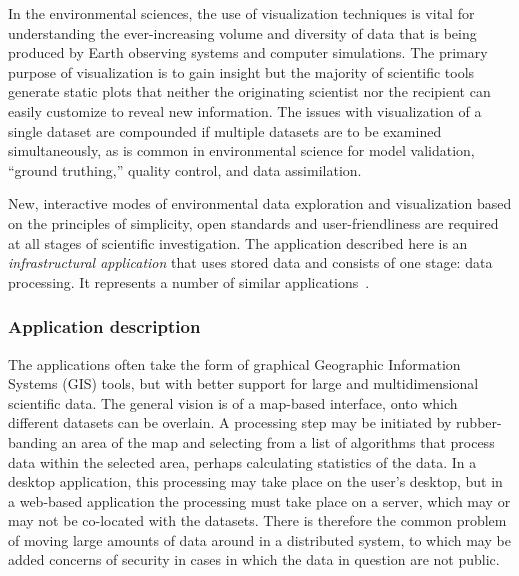 

In the environmental sciences, the use of visualization techniques is
vital for understanding the ever-increasing volume and diversity of
data that is being produced by Earth observing systems and computer
simulations.  The primary purpose of visualization is to gain insight
but the majority of scientific tools generate static plots that
neither the originating scientist nor the recipient can easily
customize to reveal new information. The issues with visualization of
a single dataset are compounded if multiple datasets are to be
examined simultaneously, as is common in environmental science for
model validation, ``ground truthing,'' quality control, and data
assimilation.

New, interactive modes of environmental data exploration and
visualization based on the principles of simplicity, open standards
and user-friendliness are required at all stages of scientific
investigation.  The application described here is an {\em
  infrastructural application} that uses stored data and consists of
one stage: data processing.  It represents a number of similar
applications~\cite{blower1,blower2}.

\subsubsection*{Application description}


The applications often take the form of graphical Geographic
Information Systems (GIS) tools, but with better support for large and multidimensional scientific data. The general vision is of a map-based interface, onto which
different datasets can be overlain.  A processing step may be initiated by rubber-banding an area of
the map and selecting from a list of algorithms that process data within the selected area, perhaps
calculating statistics of the data.  In a desktop application, this processing may take place on the user's desktop,
but in a web-based application the processing must take place on a server, which may or may not be
co-located with the datasets.  There is therefore the common problem of moving large amounts of data around in a distributed
system, to which may be added concerns of security in cases in which the data in question are not public.



